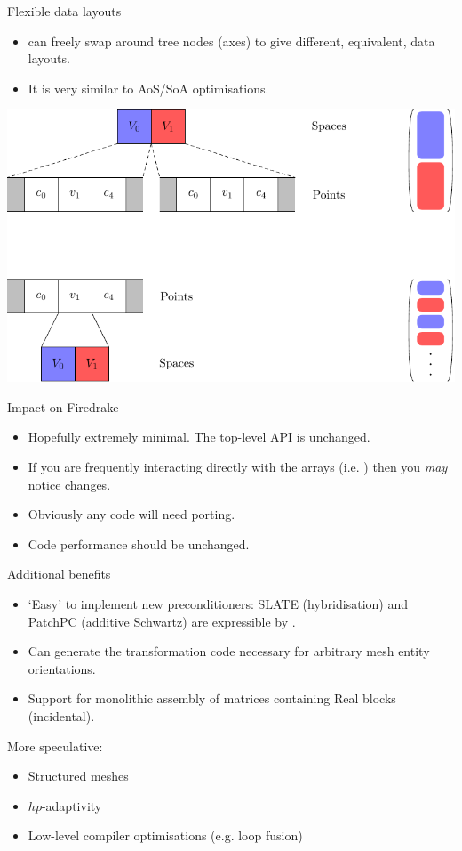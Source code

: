 \documentclass[aspectratio=169]{beamer}
\begin{document}
\begin{frame}{Flexible data layouts}
  \begin{itemize}
    \item
       can freely swap around tree nodes (axes) to give different, equivalent, data layouts.
    \item
      It is very similar to AoS/SoA optimisations.
  \end{itemize}

  \begin{center}
    \includegraphics[width=.6\textwidth]{transform.pdf}
  \end{center}
\end{frame}

\begin{frame}{Impact on Firedrake}
  \begin{itemize}
    \item
      Hopefully extremely minimal. The top-level API is unchanged.
    \item
      If you are frequently interacting directly with the arrays (i.e. ) then you \emph{may} notice changes.
    \item
      Obviously any  code will need porting.
    \item
      Code performance should be unchanged.
  \end{itemize}
\end{frame}

\begin{frame}{Additional benefits}
  \begin{itemize}
    \item
      `Easy' to implement new preconditioners: SLATE (hybridisation) and PatchPC (additive Schwartz) are expressible by .
    \item
      Can generate the transformation code necessary for arbitrary mesh entity orientations.
    \item Support for monolithic assembly of matrices containing Real blocks (incidental).
  \end{itemize}

  \vspace{1em}

  More speculative:

  \begin{itemize}
    \item Structured meshes
    \item $hp$-adaptivity
    \item Low-level compiler optimisations (e.g. loop fusion)
  \end{itemize}
\end{frame}
\end{document}
